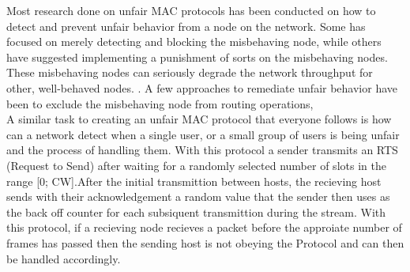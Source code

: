 \documentclass{sigcomm-alternate}
\begin{document}
{Most research done on unfair MAC protocols has been conducted on how to detect and prevent unfair behavior from a node on the network. Some has focused on merely detecting and blocking the misbehaving node, while others have suggested implementing a punishment of sorts on the misbehaving nodes. These misbehaving nodes can seriously degrade the network throughput for other, well-behaved nodes. \cite{Kyasanur}. A few approaches to remediate unfair behavior have been to exclude the misbehaving node from routing operations, \\
A similar task to creating an unfair MAC protocol that everyone follows is how can a network detect when a single user, or a small group of users is being unfair and the process of handling them. With this protocol a sender transmits an RTS (Request to Send) after waiting for a randomly selected number of slots in the range [0; CW].After the initial transmittion between hosts, the recieving host sends with their acknowledgement a random value that the sender then uses as the back off counter for each subsiquent transmittion during the stream. \cite{Kyasanur} With this protocol, if a recieving node recieves a packet before the approiate number of frames has passed then the sending host is not obeying the Protocol and can then be handled accordingly.
}



\balancecolumns
\end{document}
